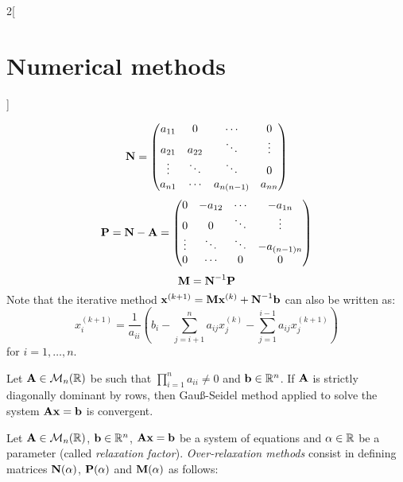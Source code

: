 \documentclass[../../../main.tex]{subfiles}
\begin{document}
\begin{multicols}{2}[\section{Numerical methods}]
\begin{definition}
    \begin{equation*}
      \boldsymbol{\mathrm{N}}=
      \begin{pmatrix}
        a_{11} & 0      & \cdots     & 0      \\
        a_{21} & a_{22} & \ddots     & \vdots \\
        \vdots & \ddots & \ddots     & 0      \\
        a_{n1} & \cdots & a_{n(n-1)} & a_{nn}
      \end{pmatrix}
    \end{equation*}
    \begin{equation*}
      \boldsymbol{\mathrm{P}}=\boldsymbol{\mathrm{N}}-\boldsymbol{\mathrm{A}}=
      \begin{pmatrix}
        0      & -a_{12} & \cdots & -a_{1n}     \\
        0      & 0       & \ddots & \vdots      \\
        \vdots & \ddots  & \ddots & -a_{(n-1)n} \\
        0      & \cdots  & 0      & 0
      \end{pmatrix}
    \end{equation*}
    \begin{equation*}
      \boldsymbol{\mathrm{M}}=\boldsymbol{\mathrm{N}}^{-1}\boldsymbol{\mathrm{P}}
    \end{equation*}
    Note that the iterative method $\boldsymbol{\mathrm{x}}^{(k+1)}=\boldsymbol{\mathrm{M}}\boldsymbol{\mathrm{x}}^{(k)}+\boldsymbol{\mathrm{N}}^{-1}\boldsymbol{\mathrm{b}}$ can also be written as: $$x_i^{(k+1)}=\frac{1}{a_{ii}}\left(b_i-\sum_{j=i+1}^na_{ij}x_j^{(k)}-\sum_{j=1}^{i-1}a_{ij}x_j^{(k+1)}\right)$$ for $i=1,\ldots,n$.
  \end{definition}
  \begin{theorem}
    Let $\boldsymbol{\mathrm{A}}\in\mathcal{M}_n(\mathbb{R})$ be such that $\prod_{i=1}^na_{ii}\ne 0$ and $\boldsymbol{\mathrm{b}}\in\mathbb{R}^n$. If $\boldsymbol{\mathrm{A}}$ is strictly diagonally dominant by rows, then Gau\ss-Seidel method applied to solve the system $\boldsymbol{\mathrm{A}}\boldsymbol{\mathrm{x}}=\boldsymbol{\mathrm{b}}$ is convergent.
  \end{theorem}
  \begin{method}
    Let $\boldsymbol{\mathrm{A}}\in\mathcal{M}_n(\mathbb{R})$, $\boldsymbol{\mathrm{b}}\in\mathbb{R}^n$, $\boldsymbol{\mathrm{A}}\boldsymbol{\mathrm{x}}=\boldsymbol{\mathrm{b}}$ be a system of equations and $\alpha\in\mathbb{R}$ be a parameter (called \textit{relaxation factor}). \textit{Over-relaxation methods} consist in defining matrices $\boldsymbol{\mathrm{N}}(\alpha)$, $\boldsymbol{\mathrm{P}}(\alpha)$ and $\boldsymbol{\mathrm{M}}(\alpha)$ as follows:

\end{method}
\end{multicols}
\end{document}
